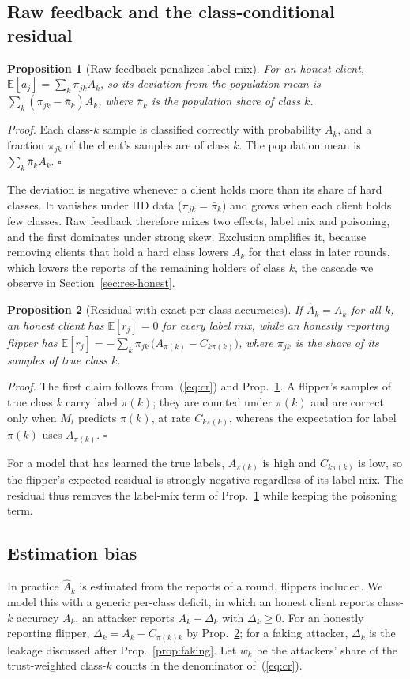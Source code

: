 \documentclass[journal]{IEEEtran}
\newtheorem{proposition}{Proposition}
\begin{document}
\subsection{Raw feedback and the class-conditional residual}

\begin{proposition}[Raw feedback penalizes label mix]\label{prop:mix}
For an honest client, $\mathbb{E}[a_j]=\sum_k\pi_{jk}A_k$, so its deviation from the population mean is $\sum_k(\pi_{jk}-\bar\pi_k)A_k$, where $\bar\pi_k$ is the population share of class $k$.
\end{proposition}
\emph{Proof.} Each class-$k$ sample is classified correctly with probability $A_k$, and a fraction $\pi_{jk}$ of the client's samples are of class $k$. The population mean is $\sum_k\bar\pi_kA_k$. \hfill$\square$

The deviation is negative whenever a client holds more than its share of hard classes. It vanishes under IID data ($\pi_{jk}=\bar\pi_k$) and grows when each client holds few classes. Raw feedback therefore mixes two effects, label mix and poisoning, and the first dominates under strong skew. Exclusion amplifies it, because removing clients that hold a hard class lowers $A_k$ for that class in later rounds, which lowers the reports of the remaining holders of class $k$, the cascade we observe in Section~\ref{sec:res-honest}.

\begin{proposition}[Residual with exact per-class accuracies]\label{prop:cr}
If $\hat A_k=A_k$ for all $k$, an honest client has $\mathbb{E}[r_j]=0$ for every label mix, while an honestly reporting flipper has $\mathbb{E}[r_j]=-\sum_k\pi_{jk}\,\big(A_{\pi(k)}-C_{k\pi(k)}\big)$, where $\pi_{jk}$ is the share of its samples of true class $k$.
\end{proposition}
\emph{Proof.} The first claim follows from~(\ref{eq:cr}) and Prop.~\ref{prop:mix}. A flipper's samples of true class $k$ carry label $\pi(k)$; they are counted under $\pi(k)$ and are correct only when $M_t$ predicts $\pi(k)$, at rate $C_{k\pi(k)}$, whereas the expectation for label $\pi(k)$ uses $A_{\pi(k)}$. \hfill$\square$

For a model that has learned the true labels, $A_{\pi(k)}$ is high and $C_{k\pi(k)}$ is low, so the flipper's expected residual is strongly negative regardless of its label mix. The residual thus removes the label-mix term of Prop.~\ref{prop:mix} while keeping the poisoning term.

\subsection{Estimation bias}
In practice $\hat A_k$ is estimated from the reports of a round, flippers included. We model this with a generic per-class deficit, in which an honest client reports class-$k$ accuracy $A_k$, an attacker reports $A_k-\Delta_k$ with $\Delta_k\ge0$. For an honestly reporting flipper, $\Delta_k=A_k-C_{\pi(k)k}$ by Prop.~\ref{prop:cr}; for a faking attacker, $\Delta_k$ is the leakage discussed after Prop.~\ref{prop:faking}. Let $w_k$ be the attackers' share of the trust-weighted class-$k$ counts in the denominator of~(\ref{eq:cr}).
\end{document}
